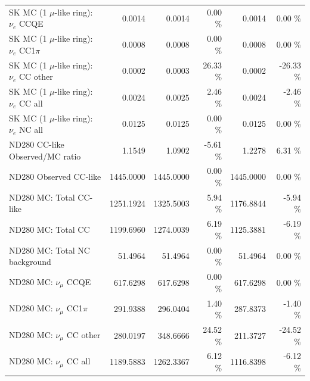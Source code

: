 \begin{table}
\begin{tabular}{| l | r | r  r | r  r |}
                             SK MC (1 $\mu$-like ring): $\nu_{e}$ CCQE &          0.0014 &          0.0014 &  0.00 \%  &          0.0014 &  0.00 \%  \\ 
                         SK MC (1 $\mu$-like ring): $\nu_{e}$ CC1$\pi$ &          0.0008 &          0.0008 &  0.00 \%  &          0.0008 &  0.00 \%  \\ 
                         SK MC (1 $\mu$-like ring): $\nu_{e}$ CC other &          0.0002 &          0.0003 & 26.33 \%  &          0.0002 & -26.33 \%  \\ 
                           SK MC (1 $\mu$-like ring): $\nu_{e}$ CC all &          0.0024 &          0.0025 &  2.46 \%  &          0.0024 & -2.46 \%  \\ 
                           SK MC (1 $\mu$-like ring): $\nu_{e}$ NC all &          0.0125 &          0.0125 &  0.00 \%  &          0.0125 &  0.00 \%  \\ 
\hline
                                       ND280 CC-like Observed/MC ratio &          1.1549 &          1.0902 & -5.61 \%  &          1.2278 &  6.31 \%  \\ 
                                                ND280 Observed CC-like &       1445.0000 &       1445.0000 &  0.00 \%  &       1445.0000 &  0.00 \%  \\ 
                                               ND280 MC: Total CC-like &       1251.1924 &       1325.5003 &  5.94 \%  &       1176.8844 & -5.94 \%  \\ 
                                                    ND280 MC: Total CC &       1199.6960 &       1274.0039 &  6.19 \%  &       1125.3881 & -6.19 \%  \\ 
                                         ND280 MC: Total NC background &         51.4964 &         51.4964 &  0.00 \%  &         51.4964 &  0.00 \%  \\ 
\hline
                                            ND280 MC: $\nu_{\mu}$ CCQE &        617.6298 &        617.6298 &  0.00 \%  &        617.6298 &  0.00 \%  \\ 
                                        ND280 MC: $\nu_{\mu}$ CC1$\pi$ &        291.9388 &        296.0404 &  1.40 \%  &        287.8373 & -1.40 \%  \\ 
                                        ND280 MC: $\nu_{\mu}$ CC other &        280.0197 &        348.6666 & 24.52 \%  &        211.3727 & -24.52 \%  \\ 
                                          ND280 MC: $\nu_{\mu}$ CC all &       1189.5883 &       1262.3367 &  6.12 \%  &       1116.8398 & -6.12 \%  \\ 

\end{tabular}
\end{table}
